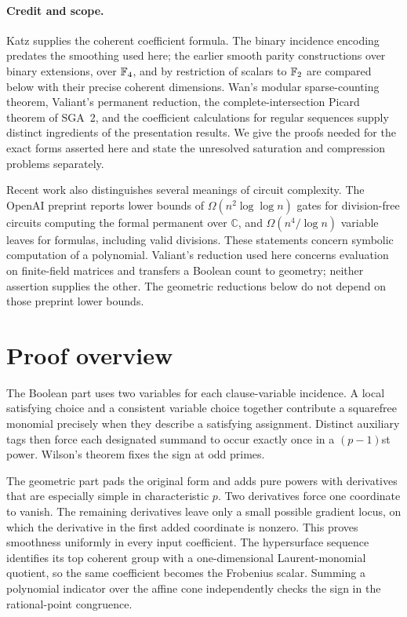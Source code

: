 \paragraph{Credit and scope.}
Katz supplies the coherent coefficient formula. The binary incidence encoding predates the smoothing used here; the earlier smooth parity constructions over binary extensions, over $\mathbb F_4$, and by restriction of scalars to $\mathbb F_2$ are compared below with their precise coherent dimensions. Wan's modular sparse-counting theorem, Valiant's permanent reduction, the complete-intersection Picard theorem of SGA~2, and the coefficient calculations for regular sequences supply distinct ingredients of the presentation results. We give the proofs needed for the exact forms asserted here and state the unresolved saturation and compression problems separately.

Recent work also distinguishes several meanings of circuit complexity. The OpenAI preprint \citep[Chapter~5, Theorems~1.1--1.3, pp.~115--116]{root-openai-permanent} reports lower bounds of $\Omega(n^2\log\log n)$ gates for division-free circuits computing the formal permanent over $\mathbb C$, and $\Omega(n^4/\log n)$ variable leaves for formulas, including valid divisions. These statements concern symbolic computation of a polynomial. Valiant's reduction used here concerns evaluation on finite-field matrices and transfers a Boolean count to geometry; neither assertion supplies the other. The geometric reductions below do not depend on those preprint lower bounds.

\section{Proof overview}
The Boolean part uses two variables for each clause-variable incidence. A local satisfying choice and a consistent variable choice together contribute a squarefree monomial precisely when they describe a satisfying assignment. Distinct auxiliary tags then force each designated summand to occur exactly once in a $(p-1)$st power. Wilson's theorem fixes the sign at odd primes.

The geometric part pads the original form and adds pure powers with derivatives that are especially simple in characteristic $p$. Two derivatives force one coordinate to vanish. The remaining derivatives leave only a small possible gradient locus, on which the derivative in the first added coordinate is nonzero. This proves smoothness uniformly in every input coefficient. The hypersurface sequence identifies its top coherent group with a one-dimensional Laurent-monomial quotient, so the same coefficient becomes the Frobenius scalar. Summing a polynomial indicator over the affine cone independently checks the sign in the rational-point congruence.

